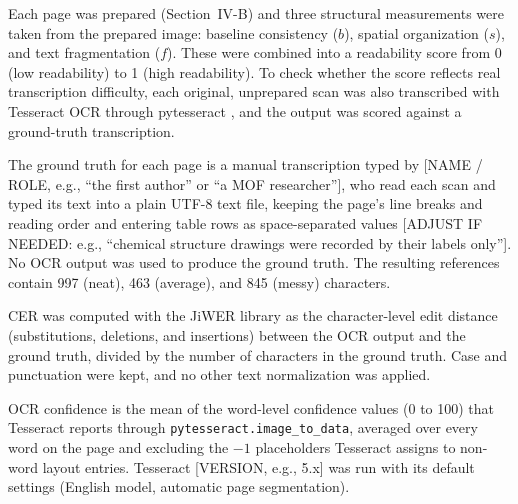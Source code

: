 Each page was prepared (Section~IV-B) and three structural measurements were
taken from the prepared image: baseline consistency ($b$), spatial
organization ($s$), and text fragmentation ($f$). These were combined into a
readability score from 0 (low readability) to 1 (high readability). To check
whether the score reflects real transcription difficulty, each original,
unprepared scan was also transcribed with Tesseract OCR
\citep{smith2007tesseract, tesseract_manual} through pytesseract
\citep{pytesseract}, and the output was scored against a ground-truth
transcription.

The ground truth for each page is a manual transcription typed by
[NAME / ROLE, e.g., ``the first author'' or ``a MOF researcher''], who read
each scan and typed its text into a plain UTF-8 text file, keeping the page's
line breaks and reading order and entering table rows as space-separated
values [ADJUST IF NEEDED: e.g., ``chemical structure drawings were recorded by
their labels only'']. No OCR output was used to produce the ground truth. The
resulting references contain 997 (neat), 463 (average), and 845 (messy)
characters.

CER was computed with the JiWER library \citep{jiwer} as the character-level
edit distance (substitutions, deletions, and insertions) between the OCR
output and the ground truth, divided by the number of characters in the
ground truth. Case and punctuation were kept, and no other text normalization
was applied.

OCR confidence is the mean of the word-level confidence values (0 to 100)
that Tesseract reports through \texttt{pytesseract.image\_to\_data}, averaged
over every word on the page and excluding the $-1$ placeholders Tesseract
assigns to non-word layout entries. Tesseract [VERSION, e.g., 5.x] was run
with its default settings (English model, automatic page segmentation).


